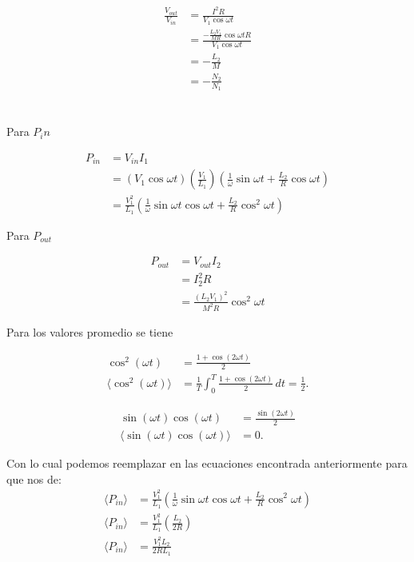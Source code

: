 \documentclass{report}
\begin{document}
\section{}

\begin{align*}
	\frac{V_{out}}{V_{in}} &= \frac{I^2 R}{V_1\cos\omega t}\\
	&= \frac{-\frac{L_2V_1}{MR}\cos\omega t R}{V_1\cos\omega t}\\
	&= - \frac{L_2}{M}\\
	&= - \frac{N_2}{N_1}
\end{align*}

\section{}

Para $P_in$

\begin{align*}
	P_{in} &= V_{in}I_1\\
	&= (V_1 \cos\omega t)\left(\frac{V_1}{L_1}\right)\left(\frac{1}{\omega}\sin\omega t + \frac{L_2}{R}\cos\omega t\right)\\
	&= \frac{V_1^2}{L_1} \left(\frac{1}{\omega}\sin\omega t\cos\omega t + \frac{L_2}{R}\cos^2\omega t\right)
\end{align*}

Para $P_{out}$

\begin{align*}
	P_{out} &= V_{out} I_2\\
	&= I_2^2 R\\
	&= \frac{(L_2 V_1)^2}{M^2 R}\cos^2\omega t
\end{align*}

Para los valores promedio se tiene

\begin{align*}
	\cos^2(\omega t) &= \frac{1 + \cos(2\omega t)}{2}\\
	\langle \cos^2(\omega t) \rangle &= \frac{1}{T} \int_0^T \frac{1 + \cos(2\omega t)}{2} \, dt = \frac{1}{2}.
\end{align*}

   \begin{align*}
	   \sin(\omega t)\cos(\omega t) &= \frac{\sin(2\omega t)}{2}\\
	   \langle \sin(\omega t)\cos(\omega t) \rangle &= 0.
   \end{align*}

Con lo cual podemos reemplazar en las ecuaciones encontrada anteriormente para que nos de:
\begin{align*}
	\langle P_{in}\rangle &= \frac{V_1^2}{L_1} \left(\frac{1}{\omega}\sin\omega t\cos\omega t + \frac{L_2}{R}\cos^2\omega t\right)\\
	\langle P_{in}\rangle &= \frac{V_1^2}{L_1} \left(\frac{L_2}{2R}\right)\\
	\langle P_{in}\rangle &= \frac{V_1^2L_2}{2RL_1}
\end{align*}
\end{document}
